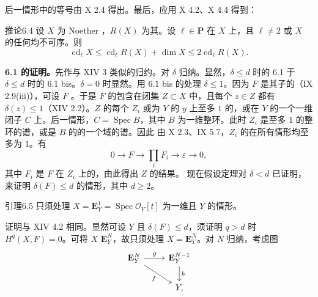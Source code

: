 后一情形中的等号由 X 2.4 得出。最后，应用 X 4.2、X 4.4 得到：
\begin{SGAresult}{推论}{6.4}
设 $X$ 为 Noether ，$R(X)$ 为其。设 $\ell\in\mathbf P$ 在 $X$ 上，且 $\ell\ne2$ 或 $X$ 的任何均不可序。则
\[\operatorname{cd}_\ell X\le\operatorname{cd}_\ell R(X)+\dim X\le2\operatorname{cd}_\ell R(X).\]
\end{SGAresult}
\textbf{6.1 的证明。}先作与 XIV 3 类似的归约。对 $\delta$ 归纳。显然，$\delta\le d$ 时的 6.1 于 $\delta\le d$ 时的 6.1 bis。$\delta=0$ 时显然。用 6.1 bis 的处理 $\delta\le1$。因为 $F$ 是其子的（IX 2.9(iii)），可设 $F$ 。于是 $F$ 的包含在闭集 $Z\subset X$ 中，且每个 $z\in Z$ 都有 $\delta(z)\le1$（XIV 2.2）。$Z$ 的每个 $Z_i$ 或为 $Y$ 的 $y$ 上至多 $1$ 的，或在 $Y$ 的一个一维闭子 $C$ 上。后一情形，$C=\operatorname{Spec}B$，其中 $B$ 为一维整环。此时 $Z_i$ 是至多 $1$ 的整环的谱，或是 $B$ 的的一个域的谱。因此
由 X 2.3、IX 5.7，$Z_i$ 的在所有情形均至多为 $1$。有
\[0\longrightarrow F\longrightarrow\prod_i F_i\longrightarrow\varepsilon\longrightarrow0,\]
其中 $F_i$ 是 $F$ 在 $Z_i$ 上的，由此得出 $Z$ 的结果。
现在假设定理对 $\delta<d$ 已证明，来证明 $\delta(F)\le d$ 的情形，其中 $d\ge2$。
\begin{SGAresult}{引理}{6.5}
只须处理 $X=\mathbf E_Y^1=\operatorname{Spec}\mathcal O_Y[t]$ 为一维且 $Y$ 的情形。
\end{SGAresult}
证明与 XIV 4.2 相同。显然可设 $Y$ 且 $\delta(F)\le d$，须证明 $q>d$ 时 $H^q(X,F)=0$。可将 $X$  $\mathbf E_Y^N$，故只须处理 $X=\mathbf E_Y^N$。对 $N$ 归纳，考虑图
\[\begin{tikzcd}\mathbf E_Y^N\arrow[r,"g"]\arrow[dr,"f"']&\mathbf E_Y^{N-1}\arrow[d,"h"]\\&Y,\end{tikzcd}\]
